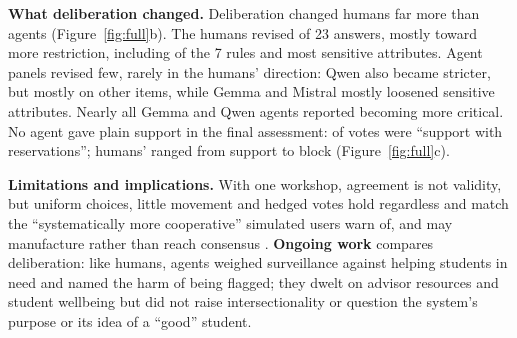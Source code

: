\documentclass[11pt,a4paper]{article}
\begin{document}
\noindent\textbf{What deliberation changed.}
Deliberation changed humans far more than agents (Figure~\ref{fig:full}b).
The humans revised \humanShiftItems{} of 23 answers, mostly toward more restriction, including \humanChangedRules{} of the 7 rules and most sensitive attributes.
Agent panels revised few, rarely in the humans' direction: Qwen also became stricter, but mostly on other items, while Gemma and Mistral mostly loosened sensitive attributes.
Nearly all Gemma and Qwen agents reported becoming more critical.
No agent gave plain support in the final assessment: \reservationsFull{} of votes were ``support with reservations''; humans' ranged from support to block (Figure~\ref{fig:full}c).

\noindent\textbf{Limitations and implications.}
With one workshop, agreement is not validity, but uniform choices, little movement and hedged votes hold regardless and match the ``systematically more cooperative'' simulated users \citet{chen2026trends} warn of, and may manufacture rather than reach consensus \citep[cf.][]{dafoe2020open,tessler2024habermas}. \textbf{Ongoing work} compares deliberation: like humans, agents weighed surveillance against helping students in need and named the harm of being flagged; they dwelt on advisor resources and student wellbeing but did not raise intersectionality or question the system's purpose or its idea of a ``good'' student.


\end{document}
